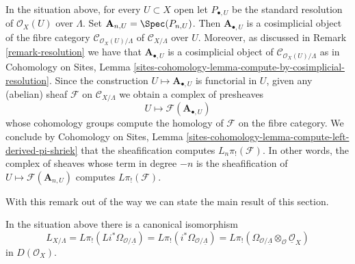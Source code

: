 \begin{remark}
\label{remark-compute-L-pi-shriek}
In the situation above, for every $U \subset X$ open let
$P_{\bullet, U}$ be the standard resolution of $\mathcal{O}_X(U)$
over $\Lambda$. Set $\mathbf{A}_{n, U} = \Spec(P_{n, U})$. Then
$\mathbf{A}_{\bullet, U}$
is a cosimplicial object of the fibre category
$\mathcal{C}_{\mathcal{O}_X(U)/\Lambda}$ of
$\mathcal{C}_{X/\Lambda}$ over $U$. Moreover, as discussed
in Remark \ref{remark-resolution} we have that $\mathbf{A}_{\bullet, U}$
is a cosimplicial object of $\mathcal{C}_{\mathcal{O}_X(U)/\Lambda}$
as in Cohomology on Sites, Lemma
\ref{sites-cohomology-lemma-compute-by-cosimplicial-resolution}.
Since the construction $U \mapsto \mathbf{A}_{\bullet, U}$ is functorial
in $U$, given any (abelian) sheaf $\mathcal{F}$ on $\mathcal{C}_{X/\Lambda}$
we obtain a complex of presheaves
$$
U \longmapsto \mathcal{F}(\mathbf{A}_{\bullet, U})
$$
whose cohomology groups compute the homology of $\mathcal{F}$ on the fibre
category. We conclude by
Cohomology on Sites, Lemma
\ref{sites-cohomology-lemma-compute-left-derived-pi-shriek}
that the sheafification computes $L_n\pi_!(\mathcal{F})$.
In other words, the complex of sheaves whose term in degree $-n$ is
the sheafification of $U \mapsto \mathcal{F}(\mathbf{A}_{n, U})$ computes
$L\pi_!(\mathcal{F})$.
\end{remark}

\noindent
With this remark out of the way we can state the main
result of this section.

\begin{lemma}
\label{lemma-cotangent-morphism-schemes}
In the situation above there is a canonical isomorphism
$$
L_{X/\Lambda} = 
L\pi_!(Li^*\Omega_{\mathcal{O}/\underline{\Lambda}}) =
L\pi_!(i^*\Omega_{\mathcal{O}/\underline{\Lambda}}) =
L\pi_!(\Omega_{\mathcal{O}/\underline{\Lambda}}
\otimes_\mathcal{O} \underline{\mathcal{O}}_X)
$$
in $D(\mathcal{O}_X)$.
\end{lemma}

